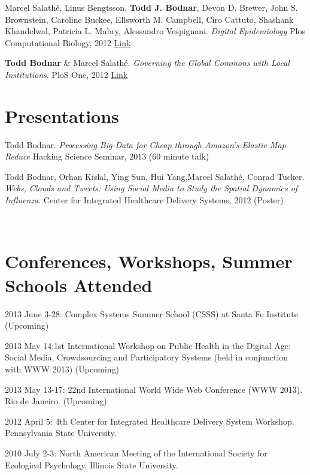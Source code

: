 \documentclass[margin,line]{res}
\newcommand{\linkToUrl}[1]{\underline{\color{blue} \href{#1}{Link}}}
\begin{document}
\begin{resume}
\begin{etaremune}[start=3]
\item Marcel Salath\'e, Linus Bengtsson, \textbf{Todd J. Bodnar}, Devon D. Brewer, John S. Brownstein, Caroline Buckee, Ellsworth M. Campbell, Ciro Cattuto, Shashank Khandelwal, Patricia L. Mabry,  Alessandro Vespignani. \textit{Digital Epidemiology} Plos Computational Biology, 2012 \linkToUrl{http://bitly.com/PO2fSx}

\item \textbf{Todd Bodnar} \& Marcel Salath\'e. \textit{Governing the Global Commons with Local Institutions}. PloS One, 2012 \linkToUrl{http://bit.ly/TtsZd5}
\end{etaremune}

\section{\sc Presentations}
\begin{etaremune}[start=2]
\item Todd Bodnar. \textit{Processing Big-Data for Cheap through Amazon's Elastic Map Reduce} Hacking Science Seminar, 2013 (60 minute talk) 
\item Todd Bodnar, Orhan Kislal, Ying Sun, Hui Yang,Marcel Salath\'e, Conrad 
Tucker. \textit{Webs, Clouds and Tweets: Using Social Media to Study the Spatial Dynamics of Influenza}. Center for Integrated Healthcare Delivery Systems, 2012 (Poster)
\end{etaremune}

\ 

\section{\sc Conferences, Workshops, Summer Schools Attended}
\begin{etaremune}[start=5]
\item 2013 June 3-28: Complex Systems Summer School (CSSS) at Santa Fe Institute. (Upcoming)
\item 2013 May 14:1st International Workshop on Public Health in the Digital Age: Social Media, Crowdsourcing and Participatory Systems (held in conjunction with WWW 2013) (Upcoming)
\item 2013 May 13-17: 22nd International World Wide Web Conference (WWW 2013). Rio de Janeiro. (Upcoming)
\item 2012 April 5: 4th Center for Integrated Healthcare Delivery System Workshop. Pennsylvania State University.
\item 2010 July 2-3: North American Meeting of the International Society for Ecological Psychology. Illinois State University.
\end{etaremune}



\end{resume}
\end{document}

